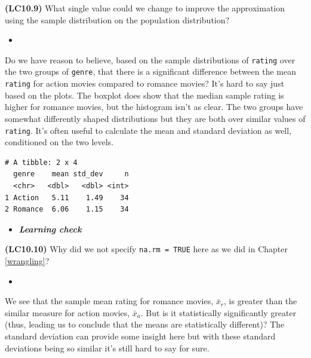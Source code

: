 \documentclass[12pt,]{krantz}
\makeatletter
\newenvironment{Shaded}{\begin{snugshade}}{\end{snugshade}}
\newcommand{\KeywordTok}[1]{\textcolor[rgb]{0.27,0.27,0.27}{\textbf{#1}}}
\newcommand{\DataTypeTok}[1]{\textcolor[rgb]{0.27,0.27,0.27}{#1}}
\newcommand{\StringTok}[1]{\textcolor[rgb]{0.5,0.5,0.5}{#1}}
\newcommand{\OperatorTok}[1]{\textcolor[rgb]{0.43,0.43,0.43}{\textbf{#1}}}
\newcommand{\NormalTok}[1]{#1}
\newenvironment{kframe}{%
\medskip{}
\setlength{\fboxsep}{.8em}
 \def\at@end@of@kframe{}%
 \ifinner\ifhmode%
  \def\at@end@of@kframe{\end{minipage}}%
  \begin{minipage}{\columnwidth}%
 \fi\fi%
 \def\FrameCommand##1{\hskip\@totalleftmargin \hskip-\fboxsep
 \colorbox{shadecolor}{##1}\hskip-\fboxsep
     \hskip-\linewidth \hskip-\@totalleftmargin \hskip\columnwidth}%
 \MakeFramed {\advance\hsize-\width
   \@totalleftmargin\z@ \linewidth\hsize
   \@setminipage}}%
 {\par\unskip\endMakeFramed%
 \at@end@of@kframe}
\renewenvironment{Shaded}{\begin{kframe}}{\end{kframe}}
\newenvironment{rmdblock}[1]
  {\begin{shaded*}
  \begin{itemize}
  \renewcommand{\labelitemi}{
    \raisebox{-.7\height}[0pt][0pt]{
    }
  }
  \item
  }
  {
  \end{itemize}
  \end{shaded*}
  }
\newenvironment{learncheck}
  {\begin{rmdblock}{warning}}
  {\end{rmdblock}}
\makeatother
\begin{document}
\textbf{(LC10.9)} What single value could we change to improve the
approximation using the sample distribution on the population
distribution?

\begin{learncheck}

\end{learncheck}

Do we have reason to believe, based on the sample distributions of
\texttt{rating} over the two groups of \texttt{genre}, that there is a
significant difference between the mean \texttt{rating} for action
movies compared to romance movies? It's hard to say just based on the
plots. The boxplot does show that the median sample rating is higher for
romance movies, but the histogram isn't as clear. The two groups have
somewhat differently shaped distributions but they are both over similar
values of \texttt{rating}. It's often useful to calculate the mean and
standard deviation as well, conditioned on the two levels.

\begin{Shaded}
\end{Shaded}

\begin{verbatim}
# A tibble: 2 x 4
  genre    mean std_dev     n
  <chr>   <dbl>   <dbl> <int>
1 Action   5.11    1.49    34
2 Romance  6.06    1.15    34
\end{verbatim}

\begin{learncheck}
\textbf{\emph{Learning check}}
\end{learncheck}

\textbf{(LC10.10)} Why did we not specify \texttt{na.rm\ =\ TRUE} here
as we did in Chapter \ref{wrangling}?

\begin{learncheck}

\end{learncheck}

We see that the sample mean rating for romance movies, \(\bar{x}_{r}\),
is greater than the similar measure for action movies, \(\bar{x}_a\).
But is it statistically significantly greater (thus, leading us to
conclude that the means are statistically different)? The standard
deviation can provide some insight here but with these standard
deviations being so similar it's still hard to say for sure.
\end{document}
